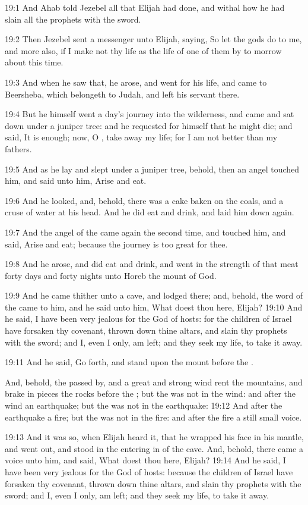 19:1 And Ahab told Jezebel all that Elijah had done, and withal how he had slain all the prophets with the sword.

19:2 Then Jezebel sent a messenger unto Elijah, saying, So let the gods do to me, and more also, if I make not thy life as the life of one of them by to morrow about this time.

19:3 And when he saw that, he arose, and went for his life, and came to Beersheba, which belongeth to Judah, and left his servant there.

19:4 But he himself went a day's journey into the wilderness, and came and sat down under a juniper tree: and he requested for himself that he might die; and said, It is enough; now, O \LORD, take away my life; for I am not better than my fathers.

19:5 And as he lay and slept under a juniper tree, behold, then an angel touched him, and said unto him, Arise and eat.

19:6 And he looked, and, behold, there was a cake baken on the coals, and a cruse of water at his head. And he did eat and drink, and laid him down again.

19:7 And the angel of the \LORD came again the second time, and touched him, and said, Arise and eat; because the journey is too great for thee.

19:8 And he arose, and did eat and drink, and went in the strength of that meat forty days and forty nights unto Horeb the mount of God.

19:9 And he came thither unto a cave, and lodged there; and, behold, the word of the \LORD came to him, and he said unto him, What doest thou here, Elijah?  19:10 And he said, I have been very jealous for the \LORD God of hosts: for the children of Israel have forsaken thy covenant, thrown down thine altars, and slain thy prophets with the sword; and I, even I only, am left; and they seek my life, to take it away.

19:11 And he said, Go forth, and stand upon the mount before the \LORD.

And, behold, the \LORD passed by, and a great and strong wind rent the mountains, and brake in pieces the rocks before the \LORD; but the \LORD was not in the wind: and after the wind an earthquake; but the \LORD was not in the earthquake: 19:12 And after the earthquake a fire; but the \LORD was not in the fire: and after the fire a still small voice.

19:13 And it was so, when Elijah heard it, that he wrapped his face in his mantle, and went out, and stood in the entering in of the cave.  And, behold, there came a voice unto him, and said, What doest thou here, Elijah?  19:14 And he said, I have been very jealous for the \LORD God of hosts: because the children of Israel have forsaken thy covenant, thrown down thine altars, and slain thy prophets with the sword; and I, even I only, am left; and they seek my life, to take it away.

